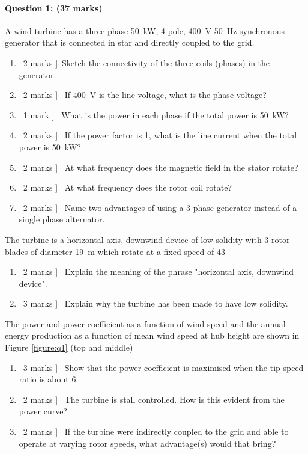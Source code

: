 \documentclass[a4paper,12pt,fleqn]{article}
\begin{document}
\paragraph{\textbf{Question 1: (37 marks)}}
A wind turbine has a three phase \SI{50}{\kilo\watt}, 4-pole, \SI{400}{\volt} \SI{50}{\hertz} synchronous generator that is connected in star
 and directly coupled to the grid.
\begin{enumerate} [label=\alph*)]
\item \lbrack\ 2 marks ]\ Sketch the connectivity of the three coils (phases) in the generator.
\item \lbrack\ 2 marks ] \ If \SI{400}{\volt} is the line voltage, what is the phase voltage?
\item \lbrack\ 1 mark ] \ What is the power in each phase if the total power is \SI{50}{\kilo\watt}?
\item \lbrack\ 2 marks ] \ If the power factor is 1, what is the line current when the total power is \SI{50}{\kilo\watt}?
\item \lbrack\ 2 marks ] \ At what frequency does the magnetic field in the stator rotate?
\item \lbrack\ 2 marks ] \ At what frequency does the rotor coil rotate?
\item \lbrack\ 2 marks ] \ Name two advantages of using a 3-phase generator instead of a single phase alternator.
\end{enumerate}
The turbine is a horizontal axis, downwind device of low solidity with 3 rotor blades of diameter \SI{19}{\metre} which rotate at a fixed speed
 of \SI{43}{\rpm}
\begin{enumerate} [resume,label=\alph*)]
\item \lbrack\ 2 marks ] \ Explain the meaning of the phrase "horizontal axis, downwind device".
\item \lbrack\ 3 marks ] \ Explain why the turbine has been made to have low solidity.  
\end{enumerate}

The power and power coefficient as a function of wind speed and the annual energy production as a function of mean wind
speed at hub height are shown in Figure \ref{figure:q1} (top and middle)



\begin{enumerate} [resume,label=\alph*)]
\item \lbrack\ 3 marks ] \ Show that the power coefficient is maximised when the tip speed ratio is about 6.
\item \lbrack\ 2 marks ] \ The turbine is stall controlled. How is this evident from the power curve?
\item \lbrack\ 2 marks ] \ If the turbine were indirectly coupled to the grid and able to operate at varying rotor speeds,
what advantage(s) would that bring?
\end{enumerate}
\end{document}
